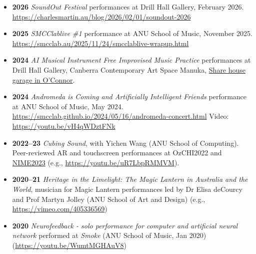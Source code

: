 \documentclass[11pt, a4paper, oneside]{article}
\begin{document}
\begin{itemize}

\item \textbf{2026} \emph{SoundOut Festival} performances at Drill Hall Gallery, February 2026. \url{https://charlesmartin.au/blog/2026/02/01/soundout-2026}

\item \textbf{2025} \emph{SMCClablive \#1} performance at ANU School of Music, November 2025. \url{https://smcclab.au/2025/11/24/smcclablive-wrapup.html}

\item \textbf{2024} \emph{AI Musical Instrument Free Improvised Music Practice} performances at Drill Hall Gallery, Canberra Contemporary Art Space Manuka, \href{https://charlesmartin.au/blog/2025/04/26/clear-skies-on-a-hill}{Share house garage in O'Connor}.

\item \textbf{2024} \emph{Andromeda is Coming and Artificially Intelligent Friends} performance at ANU School of Music, May 2024. \url{https://smcclab.github.io/2024/05/16/andromeda-concert.html} Video: \url{https://youtu.be/vH4qWDztFNk}

\item \textbf{2022--23} \emph{Cubing Sound}, with Yichen Wang (ANU School of Computing). Peer-reviewed AR and touchscreen performances at OzCHI2022 and \href{https://nime.org/proc_music/nime2023_music_1099/index.html}{NIME2023} (e.g., \url{https://youtu.be/uR7LbpRMMVM}).

\item \textbf{2020--21} \emph{Heritage in the Limelight: The Magic
    Lantern in Australia and the World}, musician for Magic Lantern
  performances led by Dr Elisa deCourcy and Prof Martyn Jolley (ANU
  School of Art and Design) (e.g., \url{https://vimeo.com/405336569})


\item \textbf{2020} \emph{Neurofeedback - solo performance for
    computer and artificial neural network} performed at \emph{Smoke}
  (ANU School of Music, Jan 2020) (\url{https://youtu.be/WumtMGHAuV8})



\end{itemize}
\end{document}
